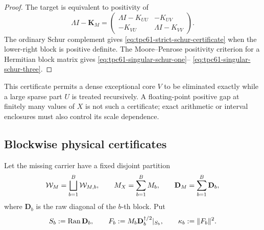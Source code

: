 \begin{proof}
The target is equivalent to positivity of
\[
 \Lambda I-\mathbf K_M
 =
 \begin{pmatrix}
  \Lambda I-K_{UU}&-K_{UV}\\
  -K_{VU}&\Lambda I-K_{VV}
 \end{pmatrix}.
\]
The ordinary Schur complement gives
\eqref{eq:tpc61-strict-schur-certificate} when the lower-right block is
positive definite.  The Moore--Penrose positivity criterion for a
Hermitian block matrix gives
\eqref{eq:tpc61-singular-schur-one}--%
\eqref{eq:tpc61-singular-schur-three}.
\end{proof}

This certificate permits a dense exceptional core \(V\) to be eliminated
exactly while a large sparse part \(U\) is treated recursively.  A
floating-point positive gap at finitely many values of \(X\) is not such a
certificate; exact arithmetic or interval enclosures must also control its
scale dependence.

\subsection{Blockwise physical certificates}

Let the missing carrier have a fixed disjoint partition
\begin{equation}
 \mathcal W_M=\bigsqcup_{b=1}^{B}\mathcal W_{M,b},
 \qquad
 M_X=\sum_{b=1}^{B}M_b,
 \qquad
 \mathbf D_M=\sum_{b=1}^{B}\mathbf D_b,
 \label{eq:tpc61-missing-block-partition}
\end{equation}
where \(\mathbf D_b\) is the raw diagonal of the \(b\)-th block.  Put
\begin{equation}
 S_b:=\operatorname{Ran}\mathbf D_b,
 \qquad
 F_b:=M_b\mathbf D_b^{\dagger/2}|_{S_b},
 \qquad
 \kappa_b:=\|F_b\|^2.
 \label{eq:tpc61-block-normalized-maps}
\end{equation}

